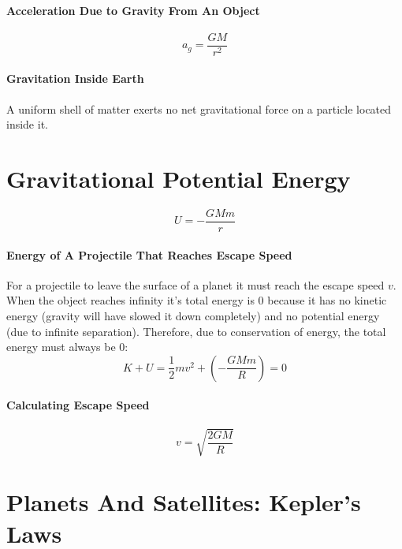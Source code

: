 \documentclass{article}
\begin{document}
        \paragraph{Acceleration Due to Gravity From An Object}
        \begin{equation}
            a_g = \frac{G M}{r^2}
        \end{equation}

        \paragraph{Gravitation Inside Earth}
        A uniform shell of matter exerts no net gravitational force on a particle located inside it.

    \section{Gravitational Potential Energy}

        \begin{equation}
            U = - \frac{G M m}{r}
        \end{equation}

        \paragraph{Energy of A Projectile That Reaches Escape Speed}
        For a projectile to leave the surface of a planet it must reach the escape speed $v$. When the object reaches infinity it's total energy is $0$ because it has no kinetic energy (gravity will have slowed it down completely) and no potential energy (due to infinite separation). Therefore, due to conservation of energy, the total energy must always be $0$:
        \begin{equation}
            K + U = \frac{1}{2} m v^2 + \left( - \frac{G M m}{R} \right) = 0
        \end{equation}

        \paragraph{Calculating Escape Speed}
        \begin{equation}
            v = \sqrt{\frac{2 G M}{R}}
        \end{equation}

    \section{Planets And Satellites: Kepler's Laws}
\end{document}
